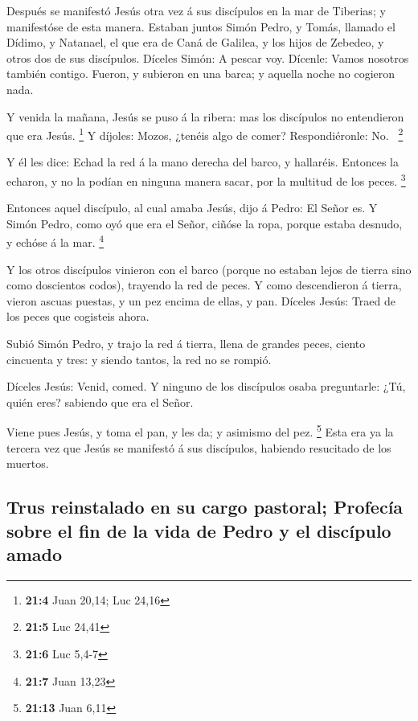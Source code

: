  Después se manifestó Jesús otra vez á sus discípulos en
la mar de Tiberias; y manifestóse de esta manera.  Estaban
juntos Simón Pedro, y Tomás, llamado el Dídimo, y Natanael, el que era
de Caná de Galilea, y los hijos de Zebedeo, y otros dos de sus
discípulos.  Díceles Simón: A pescar voy. Dícenle: Vamos
nosotros también contigo. Fueron, y subieron en una barca; y aquella
noche no cogieron nada.

 Y venida la mañana, Jesús se puso á la ribera: mas los
discípulos no entendieron que era Jesús. \footnote{\textbf{21:4} Juan
  20,14; Luc 24,16}  Y díjoles: Mozos, ¿tenéis algo de
comer? Respondiéronle: No.~ \footnote{\textbf{21:5} Luc 24,41}

 Y él les dice: Echad la red á la mano derecha del barco,
y hallaréis. Entonces la echaron, y no la podían en ninguna manera
sacar, por la multitud de los peces. \footnote{\textbf{21:6} Luc 5,4-7}

 Entonces aquel discípulo, al cual amaba Jesús, dijo á
Pedro: El Señor es. Y Simón Pedro, como oyó que era el Señor, ciñóse la
ropa, porque estaba desnudo, y echóse á la mar. \footnote{\textbf{21:7}
  Juan 13,23}

 Y los otros discípulos vinieron con el barco (porque no
estaban lejos de tierra sino como doscientos codos), trayendo la red de
peces.  Y como descendieron á tierra, vieron ascuas
puestas, y un pez encima de ellas, y pan.  Díceles Jesús:
Traed de los peces que cogisteis ahora.

 Subió Simón Pedro, y trajo la red á tierra, llena de
grandes peces, ciento cincuenta y tres: y siendo tantos, la red no se
rompió.

 Díceles Jesús: Venid, comed. Y ninguno de los discípulos
osaba preguntarle: ¿Tú, quién eres? sabiendo que era el Señor.

 Viene pues Jesús, y toma el pan, y les da; y asimismo
del pez. \footnote{\textbf{21:13} Juan 6,11}  Esta era ya
la tercera vez que Jesús se manifestó á sus discípulos, habiendo
resucitado de los muertos.

\hypertarget{trus-reinstalado-en-su-cargo-pastoral-profecuxeda-sobre-el-fin-de-la-vida-de-pedro-y-el-discuxedpulo-amado}{%
\subsection{Trus reinstalado en su cargo pastoral; Profecía sobre el fin
de la vida de Pedro y el discípulo
amado}\label{trus-reinstalado-en-su-cargo-pastoral-profecuxeda-sobre-el-fin-de-la-vida-de-pedro-y-el-discuxedpulo-amado}}

